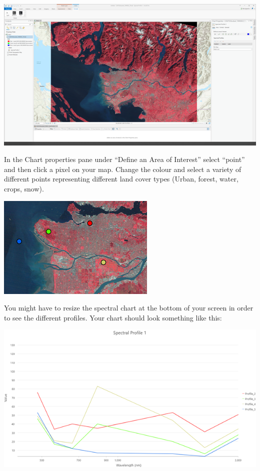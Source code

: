 \documentclass[
]{book}
\begin{document}
\begin{center}\includegraphics[width=1\linewidth]{images/01-create-spectral-profile} \end{center}

In the Chart properties pane under ``Define an Area of Interest'' select ``point'' and then click a pixel on your map. Change the colour and select a variety of different points representing different land cover types (Urban, forest, water, crops, snow).

\begin{center}\includegraphics[width=0.5\linewidth]{images/01-area-of-interest-points} \end{center}

You might have to resize the spectral chart at the bottom of your screen in order to see the different profiles. Your chart should look something like this:

\begin{center}\includegraphics[width=1\linewidth]{images/01-profile-chart} \end{center}
\end{document}
